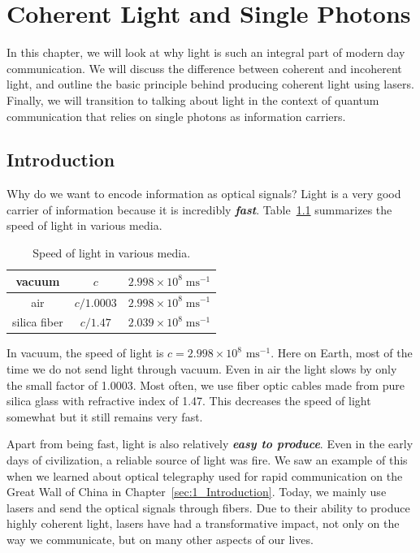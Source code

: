 \chapter{Coherent Light and Single Photons}
\label{sec:5_coherent_light_single_photons}

In this chapter, we will look at why light is such an integral part of modern day communication.
We will discuss the difference between coherent and incoherent light, and outline the basic principle behind producing coherent light using lasers.
Finally, we will transition to talking about light in the context of quantum communication that relies on single photons as information carriers.

\section{Introduction}
\label{sec:5-1_intoduction}

Why do we want to encode information as optical signals?
Light is a very good carrier of information because it is incredibly \textit{\textbf{fast}}.
Table~\ref{tab:5-1_speed_light} summarizes the speed of light in various media.
\begin{table}[b!]
    \centering
    \begin{tabular}{c|c|c}
        vacuum & $c$ & $2.998\times10^{8} \; \text{ms}^{-1}$  \\
        \hline
        air & $c/1.0003$ & $2.998\times10^{8} \; \text{ms}^{-1}$  \\
        \hline
        silica fiber & $c/1.47$ & $2.039\times10^{8} \; \text{ms}^{-1}$
    \end{tabular}
    \caption[Speed of light]{Speed of light in various media.}
    \label{tab:5-1_speed_light}
\end{table}
In vacuum, the speed of light is $c=2.998\times 10^8$ $\text{ms}^{-1}$.
Here on Earth, most of the time we do not send light through vacuum.
Even in air the light slows by only the small factor of 1.0003.
Most often, we use fiber optic cables made from pure silica glass with refractive index of 1.47.
This decreases the speed of light somewhat but it still remains very fast.

Apart from being fast, light is also relatively \textit{\textbf{easy to produce}}.
Even in the early days of civilization, a reliable source of light was fire.
We saw an example of this when we learned about optical telegraphy used for rapid communication on the Great Wall of China in Chapter~\ref{sec:1_Introduction}.
Today, we mainly use lasers and send the optical signals through fibers.
Due to their ability to produce highly coherent light, lasers have had a transformative impact, not only on the way we communicate, but on many other aspects of our lives. 


